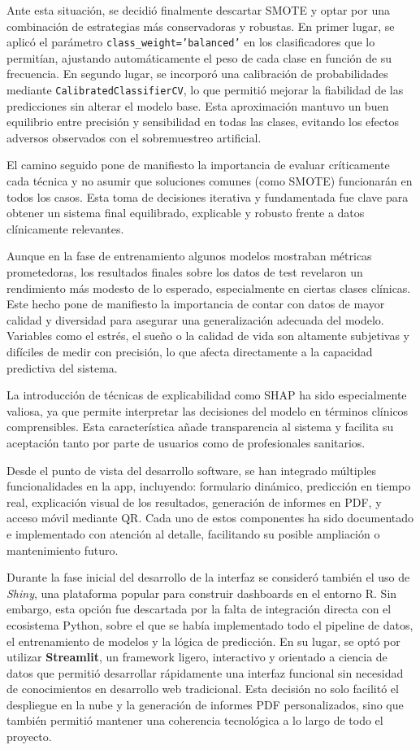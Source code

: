 Ante esta situación, se decidió finalmente descartar SMOTE y optar por una combinación de estrategias más conservadoras y robustas. En primer lugar, se aplicó el parámetro \texttt{class\_weight='balanced'} en los clasificadores que lo permitían, ajustando automáticamente el peso de cada clase en función de su frecuencia. En segundo lugar, se incorporó una calibración de probabilidades mediante \texttt{CalibratedClassifierCV}, lo que permitió mejorar la fiabilidad de las predicciones sin alterar el modelo base. Esta aproximación mantuvo un buen equilibrio entre precisión y sensibilidad en todas las clases, evitando los efectos adversos observados con el sobremuestreo artificial.

El camino seguido pone de manifiesto la importancia de evaluar críticamente cada técnica y no asumir que soluciones comunes (como SMOTE) funcionarán en todos los casos. Esta toma de decisiones iterativa y fundamentada fue clave para obtener un sistema final equilibrado, explicable y robusto frente a datos clínicamente relevantes.


Aunque en la fase de entrenamiento algunos modelos mostraban métricas prometedoras, los resultados finales sobre los datos de test revelaron un rendimiento más modesto de lo esperado, especialmente en ciertas clases clínicas. Este hecho pone de manifiesto la importancia de contar con datos de mayor calidad y diversidad para asegurar una generalización adecuada del modelo. Variables como el estrés, el sueño o la calidad de vida son altamente subjetivas y difíciles de medir con precisión, lo que afecta directamente a la capacidad predictiva del sistema.


La introducción de técnicas de explicabilidad como SHAP ha sido especialmente valiosa, ya que permite interpretar las decisiones del modelo en términos clínicos comprensibles. Esta característica añade transparencia al sistema y facilita su aceptación tanto por parte de usuarios como de profesionales sanitarios.


Desde el punto de vista del desarrollo software, se han integrado múltiples funcionalidades en la app, incluyendo: formulario dinámico, predicción en tiempo real, explicación visual de los resultados, generación de informes en PDF, y acceso móvil mediante QR. Cada uno de estos componentes ha sido documentado e implementado con atención al detalle, facilitando su posible ampliación o mantenimiento futuro.

Durante la fase inicial del desarrollo de la interfaz se consideró también el uso de \textit{Shiny}, una plataforma popular para construir dashboards en el entorno R. Sin embargo, esta opción fue descartada por la falta de integración directa con el ecosistema Python, sobre el que se había implementado todo el pipeline de datos, el entrenamiento de modelos y la lógica de predicción. En su lugar, se optó por utilizar \textbf{Streamlit}, un framework ligero, interactivo y orientado a ciencia de datos que permitió desarrollar rápidamente una interfaz funcional sin necesidad de conocimientos en desarrollo web tradicional. Esta decisión no solo facilitó el despliegue en la nube y la generación de informes PDF personalizados, sino que también permitió mantener una coherencia tecnológica a lo largo de todo el proyecto.


